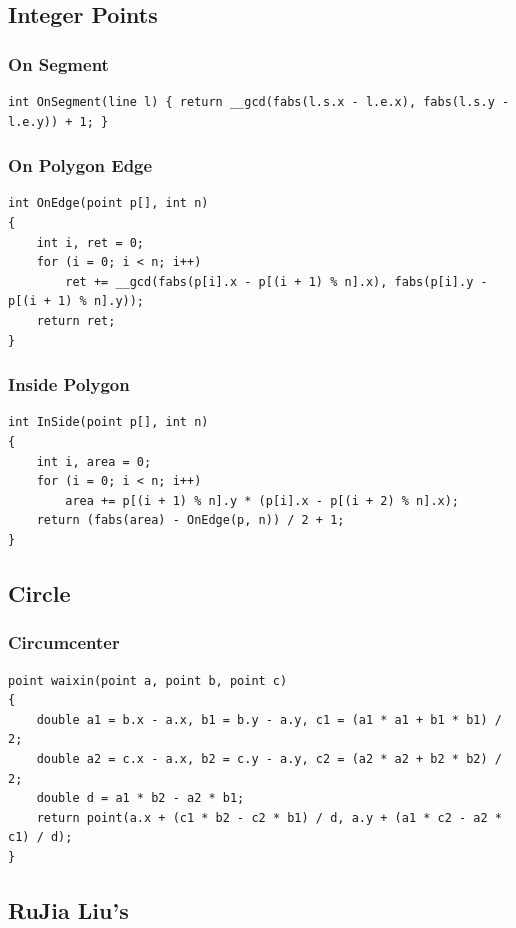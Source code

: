 \documentclass[twoside]{article}
\begin{document}
\subsection{Integer Points}
\subsubsection{On Segment}
\begin{lstlisting}
int OnSegment(line l) { return __gcd(fabs(l.s.x - l.e.x), fabs(l.s.y - l.e.y)) + 1; }
\end{lstlisting}
\subsubsection{On Polygon Edge}
\begin{lstlisting}
int OnEdge(point p[], int n)
{
    int i, ret = 0;
    for (i = 0; i < n; i++)
        ret += __gcd(fabs(p[i].x - p[(i + 1) % n].x), fabs(p[i].y - p[(i + 1) % n].y));
    return ret;
}
\end{lstlisting}
\subsubsection{Inside Polygon}
\begin{lstlisting}
int InSide(point p[], int n)
{
    int i, area = 0;
    for (i = 0; i < n; i++)
        area += p[(i + 1) % n].y * (p[i].x - p[(i + 2) % n].x);
    return (fabs(area) - OnEdge(p, n)) / 2 + 1;
}
\end{lstlisting}
\subsection{Circle}
\subsubsection{Circumcenter}
\begin{lstlisting}
point waixin(point a, point b, point c)
{
    double a1 = b.x - a.x, b1 = b.y - a.y, c1 = (a1 * a1 + b1 * b1) / 2;
    double a2 = c.x - a.x, b2 = c.y - a.y, c2 = (a2 * a2 + b2 * b2) / 2;
    double d = a1 * b2 - a2 * b1;
    return point(a.x + (c1 * b2 - c2 * b1) / d, a.y + (a1 * c2 - a2 * c1) / d);
}
\end{lstlisting}
\subsection{RuJia Liu's}
\end{document}
